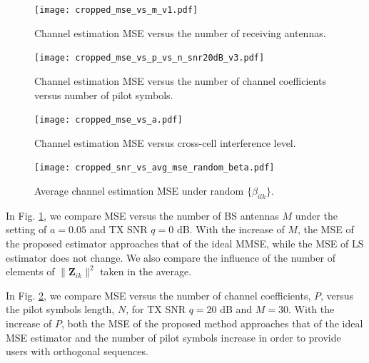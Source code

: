 \documentclass[journal,12pt,onecolumn]{IEEEtran}
\begin{document}
\begin{figure}[b]
\vspace{-4mm}
\centering
\texttt{[image: cropped\_mse\_vs\_m\_v1.pdf]}
\caption{Channel estimation MSE versus the number of receiving antennas.}
\label{fig:antennas_vs_mse}
\end{figure}

\begin{figure}[t]
\centering
\texttt{[image: cropped\_mse\_vs\_p\_vs\_n\_snr20dB\_v3.pdf]}
\caption{Channel estimation MSE versus the number of channel coefficients versus number of pilot symbols.}
\label{fig:mse_vs_p_vs_n}
\vspace{-4mm}
\end{figure}

\begin{figure}[b]
\vspace{-4mm}
\centering
\texttt{[image: cropped\_mse\_vs\_a.pdf]}
\caption{Channel estimation MSE versus cross-cell interference level.}
\label{fig:mse_vs_a}
\end{figure}

\begin{figure}[t]
\centering
\texttt{[image: cropped\_snr\_vs\_avg\_mse\_random\_beta.pdf]}
\caption{Average channel estimation MSE under random $\{\beta_{ilk}\}$.}
\label{fig:snr_vs_mse_random_beta}
\vspace{-5mm}
\end{figure}

In Fig. \ref{fig:antennas_vs_mse}, we compare MSE versus the number of BS antennas $M$ under the setting of $a = 0.05$ and TX SNR $q = 0$ dB. With the increase of $M$, the MSE of the proposed estimator approaches that of the ideal MMSE, while the MSE of LS estimator does not change. We also compare the influence of the number of elements of $\lVert \textbf{Z}_{ik} \rVert^{2}$ taken in the average.

In Fig. \ref{fig:mse_vs_p_vs_n}, we compare MSE versus the number of channel coefficients, $P$, versus the pilot symbols length, $N$, for TX SNR $q = 20$ dB and $M = 30$. With the increase of $P$, both the MSE of the proposed method approaches that of the ideal MSE estimator and the number of pilot symbols increase in order to provide users with orthogonal sequences.
\end{document}
